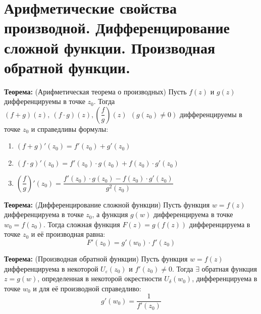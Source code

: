 \section{Арифметические свойства производной. Дифференцирование сложной
функции. Производная обратной
функции.}\label{ux430ux440ux438ux444ux43cux435ux442ux438ux447ux435ux441ux43aux438ux435-ux441ux432ux43eux439ux441ux442ux432ux430-ux43fux440ux43eux438ux437ux432ux43eux434ux43dux43eux439.-ux434ux438ux444ux444ux435ux440ux435ux43dux446ux438ux440ux43eux432ux430ux43dux438ux435-ux441ux43bux43eux436ux43dux43eux439-ux444ux443ux43dux43aux446ux438ux438.-ux43fux440ux43eux438ux437ux432ux43eux434ux43dux430ux44f-ux43eux431ux440ux430ux442ux43dux43eux439-ux444ux443ux43dux43aux446ux438ux438.}

\textbf{Теорема:} (Арифметическая теорема о производных) Пусть \(f(z)\)
и \(g(z)\) дифференцируемы в точке \(z_{0}\). Тогда
\((f+g)(z), \ (f\cdot g)(z), \left(  \dfrac{f}{g}  \right)(z) \ \ (g(z_{0})\neq0)\)
дифференцируемы в точке \(z_{0}\) и справедливы формулы:

\begin{enumerate}
\def\labelenumi{\arabic{enumi}.}
\tightlist
\item
  \((f+g)'(z_{0})=f'(z_{0})+g'(z_{0})\)
\item
  \((f\cdot g)'(z_{0})=f'(z_{0})\cdot g(z_{0})+f(z_{0})\cdot g'(z_{0})\)
\item
  \(\left( \dfrac{f}{g} \right)'(z_{0})= \dfrac{f'(z_{0})\cdot g(z_{0})-f(z_{0})\cdot g'(z_{0})}{g^{2}(z_{0})}\)
\end{enumerate}

\textbf{Теорема:} (Дифференцирование сложной функции) Пусть функция
\(w=f(z)\) дифференцируема в точке \(z_{0}\), а функция \(g(w)\)
дифференцируема в точке \(w_{0}=f(z_{0})\). Тогда сложная функция
\(F(z)=g(f(z))\) дифференцируема в точке \(z_{0}\) и её производная
равна: \[
F'(z_{0})=g'(w_{0})\cdot f'(z_{0})
\]

\textbf{Теорема:} (Производная обратной функции) Пусть функция
\(w=f(z)\) дифференцируема в некоторой \(U_{\varepsilon}(z_{0})\) и
\(f'(z_{0})\neq 0\). Тогда \(\exists\) обратная функция \(z=g(w)\),
определенная в некоторой окрестности \(U_{\delta}(w_{0})\),
дифференцируема в точке \(w_{0}\) и для её производной справедливо: \[
g'(w_{0})= \frac{1}{f'(z_{0})}
\]

